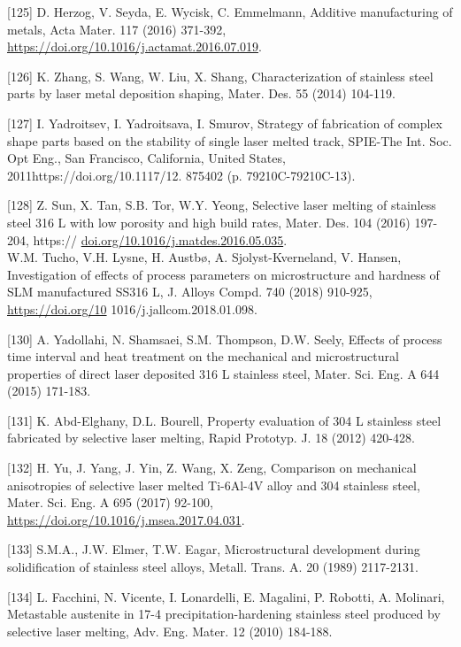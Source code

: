 \documentclass[10pt]{article}
\begin{document}
[125] D. Herzog, V. Seyda, E. Wycisk, C. Emmelmann, Additive manufacturing of metals, Acta Mater. 117 (2016) 371-392, \href{https://doi.org/10.1016/j.actamat.2016.07.019}{https://doi.org/10.1016/j.actamat.2016.07.019}.

[126] K. Zhang, S. Wang, W. Liu, X. Shang, Characterization of stainless steel parts by laser metal deposition shaping, Mater. Des. 55 (2014) 104-119.

[127] I. Yadroitsev, I. Yadroitsava, I. Smurov, Strategy of fabrication of complex shape parts based on the stability of single laser melted track, SPIE-The Int. Soc. Opt Eng., San Francisco, California, United States, 2011https://doi.org/10.1117/12. 875402 (p. 79210C-79210C-13).

[128] Z. Sun, X. Tan, S.B. Tor, W.Y. Yeong, Selective laser melting of stainless steel 316 L with low porosity and high build rates, Mater. Des. 104 (2016) 197-204, https:// \href{http://doi.org/10.1016/j.matdes.2016.05.035}{doi.org/10.1016/j.matdes.2016.05.035}.\\
[129] W.M. Tucho, V.H. Lysne, H. Austbø, A. Sjolyst-Kverneland, V. Hansen, Investigation of effects of process parameters on microstructure and hardness of SLM manufactured SS316 L, J. Alloys Compd. 740 (2018) 910-925, \href{https://doi.org/10}{https://doi.org/10} 1016/j.jallcom.2018.01.098.

[130] A. Yadollahi, N. Shamsaei, S.M. Thompson, D.W. Seely, Effects of process time interval and heat treatment on the mechanical and microstructural properties of direct laser deposited 316 L stainless steel, Mater. Sci. Eng. A 644 (2015) 171-183.

[131] K. Abd-Elghany, D.L. Bourell, Property evaluation of 304 L stainless steel fabricated by selective laser melting, Rapid Prototyp. J. 18 (2012) 420-428.

[132] H. Yu, J. Yang, J. Yin, Z. Wang, X. Zeng, Comparison on mechanical anisotropies of selective laser melted Ti-6Al-4V alloy and 304 stainless steel, Mater. Sci. Eng. A 695 (2017) 92-100, \href{https://doi.org/10.1016/j.msea.2017.04.031}{https://doi.org/10.1016/j.msea.2017.04.031}.

[133] S.M.A., J.W. Elmer, T.W. Eagar, Microstructural development during solidification of stainless steel alloys, Metall. Trans. A. 20 (1989) 2117-2131.

[134] L. Facchini, N. Vicente, I. Lonardelli, E. Magalini, P. Robotti, A. Molinari, Metastable austenite in 17-4 precipitation-hardening stainless steel produced by selective laser melting, Adv. Eng. Mater. 12 (2010) 184-188.
\end{document}
